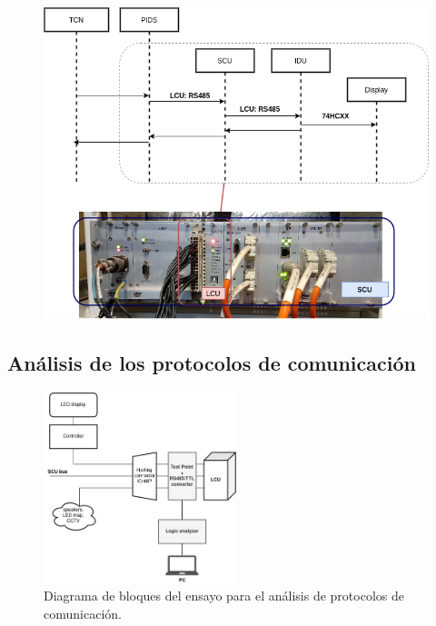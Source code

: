 \documentclass[
11pt, %
]{charter}
\begin{document}
\begin{figure}[htpb]
\centering 
\includegraphics[width=1\textwidth]{./Pics/processDiagram.map.png}
\caption{}
\label{fig:Placa de control map}
\end{figure}


\subsection{Análisis de los protocolos de comunicación}

\begin{figure}[htpb]
\centering 
\includegraphics[width=0.5\textwidth]{./Pics/sniffingDiagram.drawio.png}
\caption{Diagrama de bloques del ensayo para el análisis de protocolos de comunicación.}
\label{fig:sniffingDiagram}
\end{figure}
\end{document}
